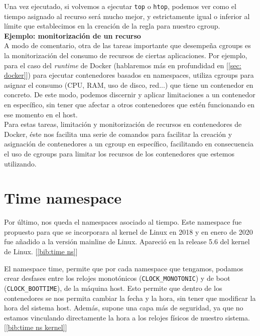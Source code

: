 \documentclass[a4paper, oneside, 12pt]{book}
\begin{document}
	\noindent Una vez ejecutado, si volvemos a ejecutar \texttt{top} o \texttt{htop}, podemos ver como el tiempo asignado al recurso será mucho mejor, y estrictamente igual o inferior al límite que establecimos en la creación de la regla para nuestro cgroup.	\\
	
	\vspace{10px}
	\noindent \textbf{\large Ejemplo: monitorización de un recurso}\\
	
	\noindent A modo de comentario, otra de las tareas importante que desempeña cgroups es la monitorización del consumo de recursos de ciertas aplicaciones. Por ejemplo, para el caso del \textit{runtime} de Docker (hablaremos más en profundidad en [\ref{sec: docker}]) para ejecutar contenedores basados en namespaces, utiliza cgroups para asignar el consumo (CPU, RAM, uso de disco, red...) que tiene un contenedor en concreto. De este modo, podemos discernir y aplicar limitaciones a un contenedor en específico, sin tener que afectar a otros contenedores que estén funcionando en ese momento en el host. \\
	
	\noindent Para estas tareas, limitación y monitorización de recursos en contenedores de Docker, éste nos facilita una serie de comandos para facilitar la creación y asignación de contenedores a un cgroup en específico, facilitando en consecuencia el uso de cgroups para limitar los recursos de los contenedores que estemos utilizando.
	
	\section{Time namespace}
	\par \noindent Por último, nos queda el namespaces asociado al tiempo. Este namespace fue propuesto para que se incorporara al kernel de Linux en 2018 y en enero de 2020 fue añadido a la versión mainline de Linux. Apareció en la release 5.6 del kernel de Linux. [\ref{bib:time ns}] \\
	
	\par \noindent El namespace time, permite que por cada namespace que tengamos, podamos crear desfases entre los relojes monotónicos (\texttt{CLOCK\_MONOTONIC}) y de boot (\texttt{CLOCK\_BOOTTIME}), de la máquina host. Esto permite que dentro de los contenedores se nos permita cambiar la fecha y la hora, sin tener que modificar la hora del sistema host. Además, supone una capa más de seguridad, ya que no estamos vinculando directamente la hora a los relojes físicos de nuestro sistema. [\ref{bib:time ns kernel}]\\
	
\end{document}
